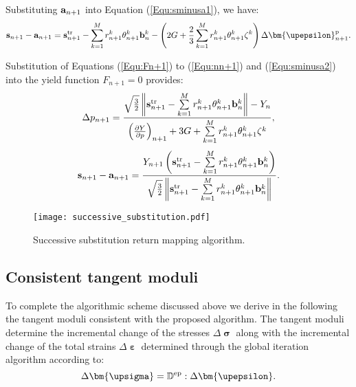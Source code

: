 Substituting ${{\bf{a}}_{n + 1}}$ into Equation (\ref{Equ:sminusa1}), we have:
\begin{equation}
\label{Equ:sminusa2}
\begin{aligned}
{{{\bf{s}}_{n + 1}} - {{\bf{a}}_{n + 1}}}=
{\bf{s}}_{n + 1}^{\rm{tr}} - \sum\limits_{k = 1}^M {r_{n + 1}^k\theta _{n + 1}^k{\bf{b}}_n^k}
- \left( {2G + \frac{2}{3}\sum\limits_{k = 1}^M {r_{n + 1}^k\theta _{n + 1}^k{\zeta ^k}} } \right)\Delta {\bm{\upepsilon }}_{n + 1}^{\rm{p}}.
\end{aligned}
\end{equation}

Substitution of Equations (\ref{Equ:Fn+1}) to (\ref{Equ:nn+1}) and (\ref{Equ:sminusa2}) into the yield function ${F_{n + 1}} = 0$ provides:
\begin{equation}
\Delta {p_{n + 1}} = \frac{{\sqrt {\frac{3}{2}} \left\| {{\bf{s}}_{n + 1}^{\rm{tr}} - \sum\limits_{k = 1}^M {r_{n + 1}^k\theta _{n + 1}^k{\bf{b}}_n^k} } \right\| - {Y_n}}}{{{{\left( {\frac{{\partial Y}}{{\partial p}}} \right)}_{n + 1}} + 3G + \sum\limits_{k = 1}^M {r_{n + 1}^k\theta _{n + 1}^k{\zeta ^k}} }},
\end{equation}
\begin{equation}
{{\bf{s}}_{n + 1}} - {{\bf{a}}_{n + 1}} = \frac{{{Y_{n + 1}}\left( {{\bf{s}}_{n + 1}^{\rm{tr}} - \sum\limits_{k = 1}^M {r_{n + 1}^k\theta _{n + 1}^k{\bf{b}}_n^k} } \right)}}{{\sqrt {\frac{3}{2}} \left\| {{\bf{s}}_{n + 1}^{\rm{tr}} - \sum\limits_{k = 1}^M {r_{n + 1}^k\theta _{n + 1}^k{\bf{b}}_n^k} } \right\|}}.
\end{equation}

\begin{figure}[ht]
	\centering
	\texttt{[image: successive\_substitution.pdf]}
	\caption{Successive substitution return mapping algorithm.}
	\label{Fig:radial_return_map}
\end{figure}

\subsection{Consistent tangent moduli}
\noindent
To complete the algorithmic scheme discussed above we derive in the following the tangent moduli consistent with the proposed algorithm. The tangent moduli determine the incremental change of the stresses $\Delta {\bm{\upsigma }}$ along with the incremental change of the total strains $\Delta {\bm{\upepsilon }}$ determined through the global iteration algorithm according to:
\begin{equation}
\Delta {\bm{\upsigma }} = {\mathbb{D}^{\rm{ep}}}:\Delta {\bm{\upepsilon }}.
\end{equation}

